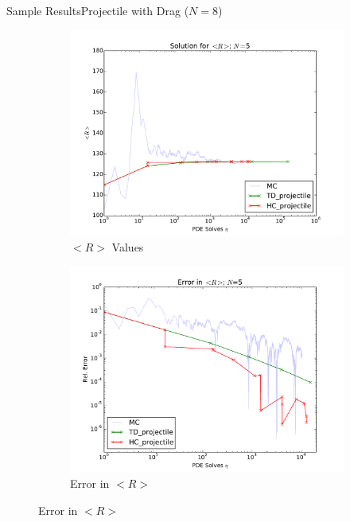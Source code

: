 \documentclass{beamer}
\begin{document}
\begin{frame}{Sample Results}{Projectile with Drag ($N=8$)}
  \begin{figure}[h!]
    \centering
    \begin{subfigure}[b]{0.49 \textwidth}
      \includegraphics[width=\textwidth]{../graphics/projectile_solns}
      \caption{$<R>$ Values}
      \label{err_5}
    \end{subfigure}
    \begin{subfigure}[b]{0.49 \textwidth}
      \includegraphics[width=\textwidth]{../graphics/projectile_errs}
      \caption{Error in $<R>$}
      \label{err_14}
    \end{subfigure}
  \end{figure}
\end{frame}
\end{document}
